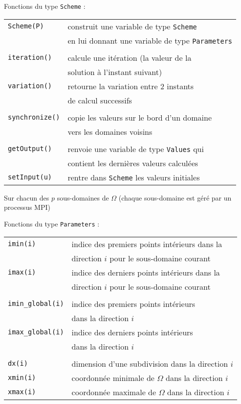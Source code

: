 \documentclass{beamer}
\begin{document}
\begin{frame}
Fonctions du type {\tt Scheme} :
\bigskip

\begin{tabular}{ll}
{\tt Scheme(P)} & construit une variable de type {\tt Scheme} \\
& en lui donnant une variable de type {\tt Parameters}\\ \\
{\tt iteration()} & calcule une itération (la valeur de la \\ 
& solution à l'instant suivant)\\
{\tt variation()} & retourne la variation entre 2 instants \\ 
& de calcul successifs\\ \\
{\tt synchronize()} & copie les valeurs sur le bord d'un domaine \\
& vers les domaines voisins \\ \\
{\tt getOutput()} & renvoie une variable de type {\tt Values} qui \\ & contient les dernières valeurs calculées \\
{\tt setInput(u)} & rentre dans {\tt Scheme} les valeurs initiales \\
\end{tabular}
	
\end{frame}

\begin{frame}

Sur chacun des $p$ sous-domaines de $\Omega$ (chaque sous-domaine est géré par un processus MPI)
\bigskip

	Fonctions du type {\tt Parameters} :
	\bigskip
	
	\begin{tabular}{ll}
		{\tt imin(i)}& indice des premiers points intérieurs dans la \\ &  direction $i$ pour le sous-domaine courant \\
		{\tt imax(i)}& indice des derniers points intérieurs dans la \\ & direction $i$ pour le sous-domaine courant\\ \\
		{\tt imin\_global(i)}& indice des premiers points intérieurs \\ &  dans la direction $i$ \\
		{\tt imax\_global(i)}& indice des derniers points intérieurs \\ & dans la direction $i$ \\ \\
		{\tt dx(i)} & dimension d'une subdivision dans la direction $i$\\
		{\tt xmin(i)} & coordonnée minimale de $\Omega$ dans la direction $i$ \\
		{\tt xmax(i)} & coordonnée maximale de $\Omega$ dans la direction $i$ \\
	\end{tabular}
	
\end{frame}
\end{document}
